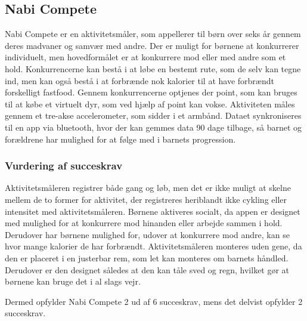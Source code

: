 \subsection{Nabi Compete}
Nabi Compete er en aktivitetsmåler, som appellerer til børn over seks år gennem deres madvaner og samvær med andre. Der er muligt for børnene at konkurrerer individuelt, men hovedformålet er at konkurrere mod eller med andre som et hold. Konkurrencerne kan bestå i at løbe en bestemt rute, som de selv kan tegne ind, men kan også bestå i at forbrænde nok kalorier til at have forbrændt forskelligt fastfood. 
Gennem konkurrencerne optjenes der point, som kan bruges til at købe et virtuelt dyr, som ved hjælp af point kan vokse. 
Aktiviteten måles gennem et tre-akse accelerometer, som sidder i et armbånd. Dataet synkroniseres til en app via bluetooth, hvor der kan gemmes data 90 dage tilbage, så barnet og forældrene har mulighed for at følge med i barnets progression. \citep{Fuhu_tech2015,Fuhu2015} 

\subsubsection{Vurdering af succeskrav}
Aktivitetsmåleren registrer både gang og løb, men det er ikke muligt at skelne mellem de to former for aktivitet, der registreres heriblandt ikke cykling eller intensitet med aktivitetsmåleren. 
Børnene aktiveres socialt, da appen er designet med mulighed for at konkurrere mod hinanden eller arbejde sammen i hold. Derudover har børnene mulighed for, 
udover at konkurrere mod andre, kan se hvor mange kalorier de har forbrændt. Aktivitetsmåleren monteres uden gene, da den er placeret i en justerbar rem, som let kan monteres om barnets håndled. Derudover er den designet således at den kan tåle sved og regn, hvilket gør at børnene kan bruge det i al slags vejr. 

Dermed opfylder Nabi Compete 2 ud af 6 succeskrav, mens det delvist opfylder 2 succeskrav.

